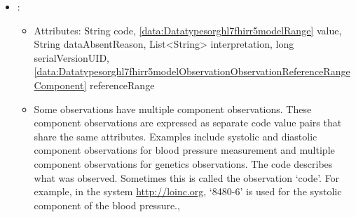 \begin{itemize}[nolistsep,noitemsep]
\begin{itemize}
The performer is who was responsible for asserting the observed value as `true'. This can refer to a Patient, Practitioner, organization, etc.
The value is the information determined as a result of making the observation, if the information has a simple value.

The dataAbsentReason provides a reason why the expected value in the element Observation.value[x] is missing.
For example, in the system \url{http://terminology.hl7.org/CodeSystem/data-absent-reason}, `not-applicable'.

The interpretation is a categorical assessment of an observation value.  For example, high, low, normal.
For example, in the system \url{http://terminology.hl7.org/CodeSystem/v3-ObservationInterpretation}, `H' for high, or `ND' for not detected.

The bodySite indicates the site on the subject's body where the observation was made (i.e. the target site).
For example, in the system \url{http://snomed.info/sct}, code `344001' indicates the ankle.

The method indicates the mechanism used to perform the observation.
For example, in the system \url{http://snomed.info/sct}, code `46973005' indicates blood pressure taking procedure.

The device attribute specifies an identifier of the device used to generate the observation data.
\end{itemize}

\item {}: 
\begin{itemize}[noitemsep,nolistsep]
\item[] Attributes: String code, \ref{data:Datatypesorghl7fhirr5modelRange} value, String dataAbsentReason, List\textless{}String\textgreater{} interpretation, long serialVersionUID, \ref{data:Datatypesorghl7fhirr5modelObservationObservationReferenceRangeComponent} referenceRange
\item[] Some observations have multiple component observations.  These component observations are expressed as separate code value pairs that share the same attributes.  Examples include systolic and diastolic component observations for blood pressure measurement and multiple component observations for genetics observations.
The code describes what was observed. Sometimes this is called the observation `code'.
For example, in the system \url{http://loinc.org}, `8480-6' is used for the systolic component of the blood pressure.,


\end{itemize}
\end{itemize}
